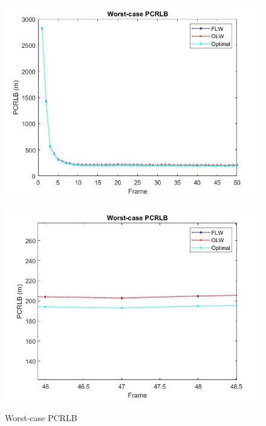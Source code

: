 \documentclass[12pt,journal,draftclsnofoot,onecolumn]{IEEEtran}
\begin{document}
 \begin{figure} 
	\begin{minipage}[t]{0.5\linewidth} 
		\centering 
		\includegraphics[scale=0.34]{Worst PCRLB.jpg} 
		\label{Path} 
	\end{minipage}%
	\begin{minipage}[t]{0.5\linewidth} 
		\centering 
		\includegraphics[scale=0.34]{Worst PCRLB_large.jpg} 
		\label{Power} 
	\end{minipage} 
\caption{Worst-case PCRLB}
\label{fig:Worst PCRLB}
\end{figure}
\end{document}
